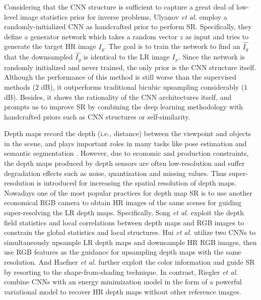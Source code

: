 {Considering that the CNN structure is sufficient to capture a great deal of low-level image statistics prior for inverse problems, Ulyanov \textit{et al.}  employ a randomly-initialized CNN as handcrafted prior to perform SR.
Specifically, they define a generator network which takes a random vector $z$ as input and tries to generate the target HR image $I_y$.
The goal is to train the network to find an $\hat{I_y}$ that the downsampled $\hat{I_y}$ is identical to the LR image $I_x$.
Since the network is randomly initialized and never trained, the only prior is the CNN structure itself.
Although the performance of this method is still worse than the supervised methods ($2$ dB), it outperforms traditional bicubic upsampling considerably ($1$ dB).
Besides, it shows the rationality of the CNN architectures itself, and prompts us to improve SR by combining the deep learning methodology with handcrafted priors such as CNN structures or self-similarity.

\label{sec_domain_specific_apps}

Depth maps record the depth (i.e., distance) between the viewpoint and objects in the scene, and plays important roles in many tasks like pose estimation  and semantic segmentation .  
However, due to economic and production constraints, the depth maps produced by depth sensors are often low-resolution and suffer degradation effects such as noise, quantization and missing values.
Thus super-resolution is introduced for increasing the spatial resolution of depth maps.
Nowadays one of the most popular practices for depth map SR is to use another economical RGB camera to obtain HR images of the same scenes for guiding super-resolving the LR depth maps.
Specifically, Song \textit{et al.}  exploit the depth field statistics and local correlations between depth maps and RGB images to constrain the global statistics and local structures.
Hui \textit{et al.}  utilize two CNNs to simultaneously upsample LR depth maps and downsample HR RGB images, then use RGB features as the guidance for upsampling depth maps with the same resolution.
And Haefner \textit{et al.}  further exploit the color information and guide SR by resorting to the shape-from-shading technique.
In contrast, Riegler \textit{et al.}  combine CNNs with an energy minimization model in the form of a powerful variational model to recover HR depth maps without other reference images.

}

